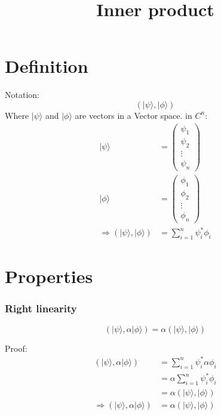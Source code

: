\documentclass{article}
\begin{document}
\title{Inner product}

\section{Definition}
Notation:
\begin{equation}
    (|\psi\rangle,|\phi\rangle)
\end{equation}
Where $|\psi\rangle$ and $|\phi\rangle$ are vectors in a Vector space.
in $C^n$:
\begin{equation}
    \begin{split}
        |\psi\rangle & = \begin{pmatrix} \psi_1 \\ \psi_2 \\ \vdots \\ \psi_n \end{pmatrix} \\
        |\phi\rangle & = \begin{pmatrix} \phi_1 \\ \phi_2 \\ \vdots \\ \phi_n \end{pmatrix} \\
        \Longrightarrow (|\psi\rangle,|\phi\rangle) & = \sum_{i=1}^{n}\psi_i^*\phi_i
    \end{split}
\end{equation}

\section{Properties}

\subsubsection{Right linearity}
\begin{equation}
    (|\psi\rangle,\alpha|\phi\rangle) = \alpha(|\psi\rangle,|\phi\rangle)
\end{equation}

Proof:
\begin{equation}
    \begin{split}
        (|\psi\rangle,\alpha|\phi\rangle) & = \sum_{i=1}^{n}\psi_i^*\alpha\phi_i \\
        & = \alpha\sum_{i=1}^{n}\psi_i^*\phi_i \\
        & = \alpha(|\psi\rangle,|\phi\rangle) \\
        \Longrightarrow (|\psi\rangle,\alpha|\phi\rangle) & = \alpha(|\psi\rangle,|\phi\rangle) \\
    \end{split}
\end{equation}
\end{document}
